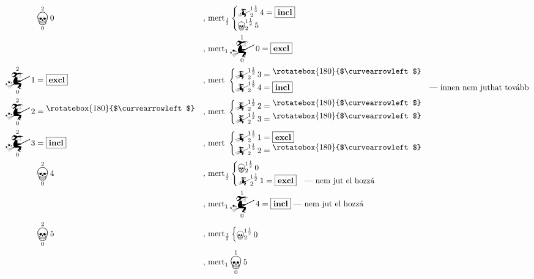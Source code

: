 \documentclass{article}
\newcommand{\nothing}{\text{\raisebox{0.4em}{\rotatebox{180}{$\curvearrowleft$}}}}%
\newcommand{\just}[1]{\boxed{#1}}%
\newcommand{\incl}{\mathbf{incl}}
\newcommand{\excl}{\mathbf{excl}}
\newcommand{\mainfun}[3]{\mathwitch_{#1}^{#2}#3}
\newcommand{\nomainfun}[3]{\bigskull_{#1}^{#2}#3}
\begin{document}
	\begin{align*}
		&\nomainfun020               &&\text{, mert}_\frac12\begin{cases}\mainfun2{1\frac12}4=\just\incl\\\nomainfun2{1\frac12}5\end{cases}\\
		&                            &&\text{, mert}_1\mainfun010=\just\excl\\
		\mainfun021   &= \just\excl  &&\text{, mert }\begin{cases}\mainfun2{1\frac12}3 = \nothing\\\mainfun2{1\frac12}4 = \just\incl&\text{--- innen nem juthat tovább}\end{cases}\\
		\mainfun022   &= \nothing    &&\text{, mert }\begin{cases}\mainfun2{1\frac12}2 = \nothing\\\mainfun2{1\frac12}3 = \nothing&\end{cases}\\
		\mainfun023   &= \just\incl  &&\text{, mert }\begin{cases}\mainfun2{1\frac12}1 = \just\excl\\\mainfun2{1\frac12}2 = \nothing&\end{cases}\\
		&\nomainfun024               &&\text{, mert}_\frac12\begin{cases}\nomainfun2{1\frac12}0\\\mainfun2{1\frac12}1 = \just\excl&\text{--- nem jut el hozzá}\end{cases}\\
		&                            &&\text{, mert}_1\mainfun014=\just\incl\text{ --- nem jut el hozzá}\\
		&\nomainfun025               &&\text{, mert}_\frac12\begin{cases}\nomainfun2{1\frac12}0\end{cases}\\
		&                            &&\text{, mert}_1\nomainfun015
	\end{align*}
\end{document}
